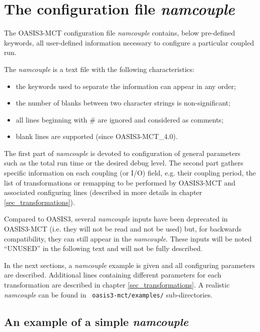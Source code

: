 \newpage
\chapter{The configuration file {\it namcouple}}
\label{sec_namcouple}

The OASIS3-MCT configuration file {\it namcouple} contains, below
pre-defined keywords, all user-defined information necessary to
configure a particular coupled run.

The {\it namcouple} is a text file with the following characteristics:

\begin{itemize}
\item the keywords used to separate the information can appear in any
  order;
\item the number of blanks between two character strings is
  non-significant;
\item all lines beginning with \# are ignored and considered as
  comments;
\item blank lines are supported (since OASIS3-MCT\_4.0).
\end{itemize}

The first part of {\it namcouple } is devoted to configuration of
general parameters such as the total run time or the desired debug level.
The second part gathers specific
information on each coupling (or I/O) field, e.g. their coupling
period, the list of transformations or remapping to be performed
by OASIS3-MCT and associated configuring lines (described in more
details in chapter \ref{sec_transformations}).

Compared to OASIS3, several {\it namcouple} inputs have been deprecated
in OASIS3-MCT (i.e. they will not be read and not be used)
but, for backwards compatibility, they can still appear in the {\it namcouple}.  These
inputs will be noted ``UNUSED'' in the following text and will not be fully described.

In the next sections, a {\it namcouple} example is given and
all configuring parameters are described. Additional lines
containing different parameters for each transformation
are described in chapter \ref{sec_transformations}. A realistic {\it
  namcouple} can be found in {\tt
  oasis3-mct/examples/} sub-directories.

\section{An example of a simple {\it namcouple}}
\label{subsec_examplenamcouple}

